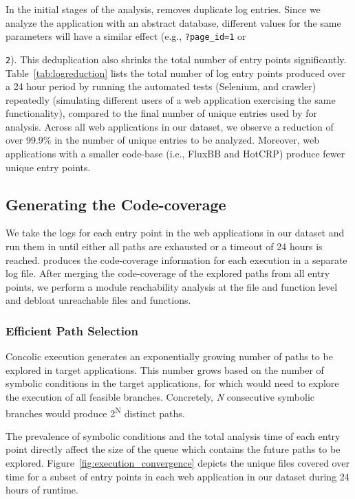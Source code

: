 In the initial stages of the analysis, \animatedead{} removes duplicate log entries. 
Since we analyze the application with an abstract database, different values for the same parameters will have a similar effect (e.g., \texttt{?page\_id=1} or {\texttt{2}). 
This deduplication also shrinks the total number of entry points significantly. 
Table~\ref{tab:logreduction} lists the total number of log entry points produced over a 24 hour period by running the automated tests (Selenium, and crawler) repeatedly (simulating different users of a web application exercising the same functionality), compared to the final number of unique entries used by \animatedead{} for analysis. 
Across all web applications in our dataset, we observe a reduction of over 99.9\% in the number of unique entries to be analyzed. 
Moreover, web applications with a smaller code-base (i.e., FluxBB and HotCRP) produce fewer unique entry points. 

\subsection{Generating the Code-coverage}

We take the logs for each entry point in the web applications in our dataset and run them in \animatedead{} until either all paths are exhausted or a timeout of 24 hours is reached. 
\animatedead{} produces the code-coverage information for each execution in a separate log file. 
After merging the code-coverage of the explored paths from all entry points, we perform a module reachability analysis at the file and function level and debloat unreachable files and functions. 

\subsubsection{Efficient Path Selection}
\label{sec:path_priority}
Concolic execution generates an exponentially growing number of paths to be explored in target applications. 
This number grows based on the number of symbolic conditions in the target applications, for which \animatedead{} would need to explore the execution of all feasible branches. 
Concretely, \emph{N} consecutive symbolic branches would produce 2\textsuperscript{N} distinct paths. 

The prevalence of symbolic conditions and the total analysis time of each entry point directly affect the size of the queue which contains the future paths to be explored. 
Figure~\ref{fig:execution_convergence} depicts the unique files covered over time for a subset of entry points in each web application in our dataset during 24 hours of runtime. 

}
